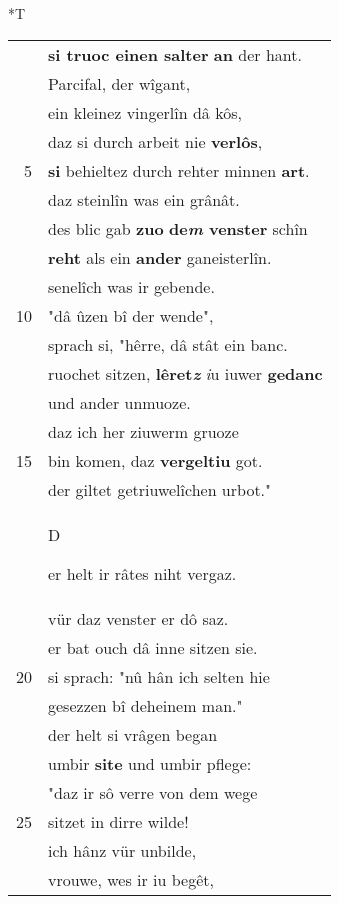 \documentclass[8pt,a4paper,notitlepage]{article}
\begin{document}
\begin{table}[ht]
\begin{minipage}[t]{0.5\linewidth}
\end{minipage}
\hspace{0.5cm}
\begin{minipage}[t]{0.5\linewidth}
\small
\begin{center}*T
\end{center}
\begin{tabular}{rl}
 & \textbf{si truoc einen salter} \textbf{an} der hant.\\ 
 & Parcifal, der wîgant,\\ 
 & ein kleinez vingerlîn dâ kôs,\\ 
 & daz si durch arbeit nie \textbf{verlôs},\\ 
5 & \textbf{si} behieltez durch rehter minnen \textbf{art}.\\ 
 & daz steinlîn was ein grânât.\\ 
 & des blic gab \textbf{zuo} \textbf{de\textit{m} venster} schîn\\ 
 & \textbf{reht} als ein \textbf{ander} ganeisterlîn.\\ 
 & senelîch was ir gebende.\\ 
10 & "dâ ûzen bî der wende",\\ 
 & sprach si, "hêrre, dâ stât ein banc.\\ 
 & ruochet sitzen, \textbf{lêret\textit{z}} \textit{i}u iuwer \textbf{gedanc}\\ 
 & und ander unmuoze.\\ 
 & daz ich her ziuwerm gruoze\\ 
15 & bin komen, daz \textbf{vergeltiu} got.\\ 
 & der giltet getriuwelîchen urbot."\\ 
 & \begin{large}D\end{large}er helt ir râtes niht vergaz.\\ 
 & vür daz venster er dô saz.\\ 
 & er bat ouch dâ inne sitzen sie.\\ 
20 & si sprach: "nû hân ich selten hie\\ 
 & gesezzen bî deheinem man."\\ 
 & der helt si vrâgen began\\ 
 & umbir \textbf{site} und umbir pflege:\\ 
 & "daz ir sô verre von dem wege\\ 
25 & sitzet in dirre wilde!\\ 
 & ich hânz vür unbilde,\\ 
 & vrouwe, wes ir iu begêt,\\ 

\end{tabular}
\end{minipage}
\end{table}
\end{document}

